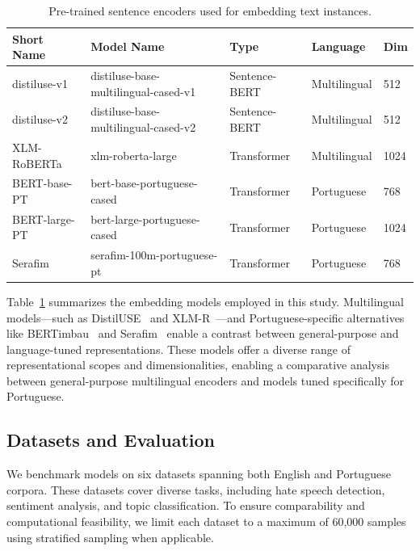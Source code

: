 \documentclass[12pt]{article}
\begin{document}
\renewcommand{\arraystretch}{0.9}
\begin{table}[ht]
\small
\centering
\caption{Pre-trained sentence encoders used for embedding text instances.}
\label{tab:encoders}
\begin{tabular}{p{2.4cm} p{5.2cm} p{2.4cm} p{2.2cm} p{0.8cm}}
\toprule
\textbf{Short Name} & \textbf{Model Name} & \textbf{Type} & \textbf{Language} & \textbf{Dim} \\
\midrule
distiluse-v1    & distiluse-base-multilingual-cased-v1 & Sentence-BERT & Multilingual & 512 \\
distiluse-v2    & distiluse-base-multilingual-cased-v2 & Sentence-BERT & Multilingual & 512 \\
XLM-RoBERTa     & xlm-roberta-large                    & Transformer   & Multilingual & 1024 \\
BERT-base-PT    & bert-base-portuguese-cased           & Transformer   & Portuguese   & 768 \\
BERT-large-PT   & bert-large-portuguese-cased          & Transformer   & Portuguese   & 1024 \\
Serafim         & serafim-100m-portuguese-pt           & Transformer   & Portuguese   & 768 \\
\bottomrule
\end{tabular}
\end{table}
\vspace{-0.8em}


Table~\ref{tab:encoders} summarizes the embedding models employed in this study. 
Multilingual models—such as DistilUSE~\cite{reimers2019sentence} and XLM-R~\cite{conneau2020unsupervised}—and Portuguese-specific alternatives like BERTimbau~\cite{souza2020bertimbau} and Serafim~\cite{souza2023serafim} enable a contrast between general-purpose and language-tuned representations. These models offer a diverse range of representational scopes and dimensionalities, enabling a comparative analysis between general-purpose multilingual encoders and models tuned specifically for Portuguese.

\subsection{Datasets and Evaluation}

We benchmark models on six datasets spanning both English and Portuguese corpora. These datasets cover diverse tasks, including hate speech detection, sentiment analysis, and topic classification. To ensure comparability and computational feasibility, we limit each dataset to a maximum of 60,000 samples using stratified sampling when applicable.
\end{document}
